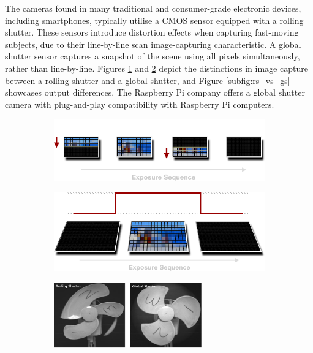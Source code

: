 The cameras found in many traditional and consumer-grade electronic devices, including smartphones, typically utilise a CMOS sensor equipped with a rolling shutter. These sensors introduce distortion effects when capturing fast-moving subjects, due to their line-by-line scan image-capturing characteristic. A global shutter sensor captures a snapshot of the scene using all pixels simultaneously, rather than line-by-line. Figures \ref{subfig:rs_timeline} and \ref{subfig:gs_timeline} depict the distinctions in image capture between a rolling shutter and a global shutter, and Figure \ref{subfig:rs_vs_gs} showcases output differences. The Raspberry Pi company offers a global shutter camera with plug-and-play compatibility with Raspberry Pi computers.

\begin{figure}[H]
    \centering
    \begin{subfigure}{.45\textwidth}
        \centering
        \includegraphics[width=1\linewidth]{assets/rolling-shutter-timeline.png}
        \caption{}
        \label{subfig:rs_timeline}
    \end{subfigure}
    \hfill
    \begin{subfigure}{.45\textwidth}
        \centering
        \includegraphics[width=1\linewidth]{assets/global-shutter-timeline.png}
        \caption{}
        \label{subfig:gs_timeline}
    \end{subfigure}
    \hfill
    \begin{subfigure}{0.45\textwidth}
        \centering
        \includegraphics[width=0.7\textwidth]{assets/rolling-vs-global-shutter.jpeg}

\end{subfigure}
\end{figure}
